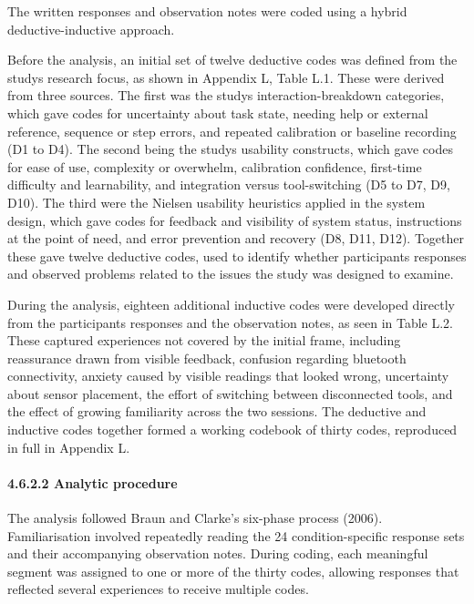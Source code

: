 \documentclass[
]{article}
\begin{document}
The written responses and observation notes were coded using a hybrid deductive-inductive approach.

Before the analysis, an initial set of twelve deductive codes was defined from the study\textquotesingle s research focus, as shown in Appendix L, Table L.1. These were derived from three sources. The first was the study\textquotesingle s interaction-breakdown categories, which gave codes for uncertainty about task state, needing help or external reference, sequence or step errors, and repeated calibration or baseline recording (D1 to D4). The second being the study\textquotesingle s usability constructs, which gave codes for ease of use, complexity or overwhelm, calibration confidence, first-time difficulty and learnability, and integration versus tool-switching (D5 to D7, D9, D10). The third were the Nielsen usability heuristics applied in the system design, which gave codes for feedback and visibility of system status, instructions at the point of need, and error prevention and recovery (D8, D11, D12). Together these gave twelve deductive codes, used to identify whether participants\textquotesingle{} responses and observed problems related to the issues the study was designed to examine.

During the analysis, eighteen additional inductive codes were developed directly from the participants\textquotesingle{} responses and the observation notes, as seen in Table L.2. These captured experiences not covered by the initial frame, including reassurance drawn from visible feedback, confusion regarding bluetooth connectivity, anxiety caused by visible readings that looked wrong, uncertainty about sensor placement, the effort of switching between disconnected tools, and the effect of growing familiarity across the two sessions. The deductive and inductive codes together formed a working codebook of thirty codes, reproduced in full in Appendix L.

\hypertarget{analytic-procedure}{%
\paragraph{4.6.2.2 Analytic procedure}\label{analytic-procedure}}

The analysis followed Braun and Clarke's six-phase process (2006). Familiarisation involved repeatedly reading the 24 condition-specific response sets and their accompanying observation notes. During coding, each meaningful segment was assigned to one or more of the thirty codes, allowing responses that reflected several experiences to receive multiple codes.
\end{document}
